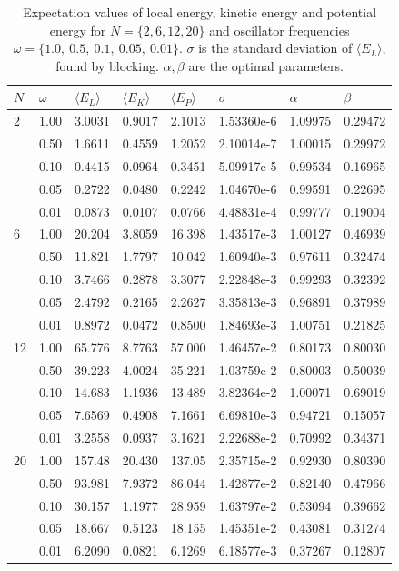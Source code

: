 \documentclass[english, a4paper]{article}
\newcommand\bk[1]{\langle#1\rangle}
\begin{document}
		\begin{table}[H]
			\begin{center}
				\caption{Expectation values of local energy, kinetic energy and potential energy for $N=\{2,6,12,20\}$ and oscillator frequencies $\omega = \{1.0,\:0.5,\:0.1,\:0.05,\:0.01\}$. $\sigma$ is the standard deviation of $\langle E_L\rangle$, found by blocking. $\alpha,\beta$ are the optimal parameters.}
				\begin{tabularx}{\textwidth}{@{}YYYYYYYY@{}}
					$N$	& $\omega$ & $\bk{E_L}$ & $\bk{E_K}$ & $\bk{E_P}$ & $\sigma$ & $\alpha$ & $\beta$\\
						&	1.00 & 3.0031 & 0.9017 & 2.1013 & 1.53360e-6 & 1.09975 & 0.29472 \\
					&	0.50 & 1.6611 & 0.4559 & 1.2052 & 2.10014e-7 & 1.00015 & 0.29972 \\
					&	0.10 & 0.4415 & 0.0964 & 0.3451 & 5.09917e-5 & 0.99534 & 0.16965 \\
					&	0.05 & 0.2722 & 0.0480 & 0.2242 & 1.04670e-6 & 0.99591 & 0.22695 \\
					&   0.01 & 0.0873 & 0.0107 & 0.0766 & 4.48831e-4 & 0.99777 & 0.19004 \\
					   &	1.00 & 20.204 & 3.8059 & 16.398 & 1.43517e-3 & 1.00127 & 0.46939 \\
					&	0.50 & 11.821 & 1.7797 & 10.042 & 1.60940e-3 & 0.97611 & 0.32474 \\
					&	0.10 & 3.7466 & 0.2878 & 3.3077 & 2.22848e-3 & 0.99293 & 0.32392 \\
					&	0.05 & 2.4792 & 0.2165 & 2.2627 & 3.35813e-3 & 0.96891 & 0.37989 \\
					&   0.01 & 0.8972 & 0.0472 & 0.8500 & 1.84693e-3 & 1.00751 & 0.21825 \\
					  &	1.00 & 65.776 & 8.7763 & 57.000 & 1.46457e-2 & 0.80173 & 0.80030 \\
					&	0.50 & 39.223 & 4.0024 & 35.221 & 1.03759e-2 & 0.80003 & 0.50039 \\
					&	0.10 & 14.683 & 1.1936 & 13.489 & 3.82364e-2 & 1.00071 & 0.69019 \\
					&	0.05 & 7.6569 & 0.4908 & 7.1661 & 6.69810e-3 & 0.94721 & 0.15057 \\
					&   0.01 & 3.2558 & 0.0937 & 3.1621 & 2.22688e-2 & 0.70992 & 0.34371 \\
					  &	1.00 & 157.48 & 20.430 & 137.05 & 2.35715e-2 & 0.92930 & 0.80390 \\
					&	0.50 & 93.981 & 7.9372 & 86.044 & 1.42877e-2 & 0.82140 & 0.47966 \\
					&	0.10 & 30.157 & 1.1977 & 28.959 & 1.63797e-2 & 0.53094 & 0.39662 \\
					&	0.05 & 18.667 & 0.5123 & 18.155 & 1.45351e-2 & 0.43081 & 0.31274 \\
					&   0.01 & 6.2090 & 0.0821 & 6.1269 & 6.18577e-3 & 0.37267 & 0.12807 \\
					\bottomrule
				\end{tabularx}
				\label{tab:EnergiesVarianceAndOptimalParameters}
			\end{center}
		\end{table}
	
\end{document}
